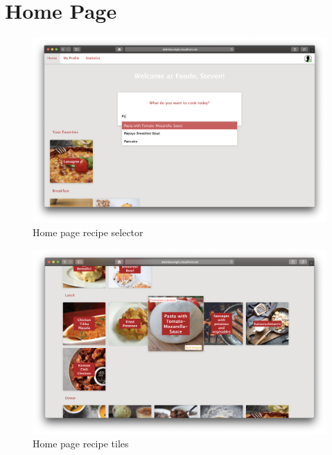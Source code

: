 \section*{Home Page}
\vspace{-2em}
\begin{figure}[H]
	\captionsetup{justification=centering}
	\begin{center}
		\includegraphics[scale=0.30]{Ressourcen/img/screenshots/screenshotF.png}
		\vspace{-3em}
		\caption{Home page recipe selector }
		\label{fig:recipeSelector}
	\end{center}
\end{figure}
\vspace{-2em}
\begin{figure}[H]
	\captionsetup{justification=centering}
	\begin{center}
		\includegraphics[scale=0.30]{Ressourcen/img/screenshots/screenshotG.png}
		\vspace{-3em}
		\caption{Home page recipe tiles}
		\label{fig:recipeTiles}
	\end{center}
\end{figure}

